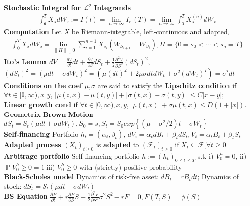 \documentclass[10pt,landscape, a4paper]{article}
\theoremstyle{remark}
\newcommand{\prob}{\operatorname{\mathbb{P}}}
\newcommand{\abs}[1]{\left\lvert #1 \right\rvert}
\begin{document}
\begin{multicols*}{3}
\textbf{Stochastic Integral for $\mathcal{L}^2$ Integrands}
\begin{align*}
    \int^T_0 X_s d W_s := I(t) =\lim_{n \to \infty} I_n (T) =\lim_{n \to \infty } \int^T_{0} X_s^{(n)} d W_s
\end{align*}
\textbf{Computation} Let $X$ be Riemann-integrable, left-continuous and adapted,
\begin{align*}
    \int^T_0 X_s dW_s = \lim_{\lVert \Pi \rVert \downarrow 0} \sum^{n-1}_{i=1} X_{s_i} (W_{S_{i+1}} - W_{S_i}), \Pi = \{0 =s_0 < \cdots < s_n =T \}
\end{align*}
\textbf{Ito's Lemma} $dV = \frac{\partial V}{\partial t} dt + \frac{\partial V}{\partial S} dS_t + \frac{1}{2} \frac{\partial^2 V}{\partial S^2} (dS_t)^2$, $(dS_t)^2 = (\mu dt + \sigma dW_t)^2 = \left(\mu (dt)^2 +2\mu \sigma dt dW_t + \sigma^2 (dW_t)^2\right) = \sigma^2 dt$\\
\textbf{Conditions on the coef} $\mu , \sigma$ are said to satisfy the \textbf{Lipschitz condition} if $\forall t \in [0, \infty), x, y$, 
$\abs{\mu(t, x) - \mu(t, y)} + \abs{\sigma(t, x) - \sigma(t, y)} \leq C \abs{x-y}$;\\
\textbf{Linear growth cond} if $\forall t \in [0, \infty), x, y$, $\abs{\mu (t, x)} + \sigma{\mu (t, x)} \leq D (1 + \abs{x})$.\\

\textbf{Geometrix Brown Motion} $dS_t = S_t (\mu dt + \sigma dW_t), S_0 = s, S_t = S_0 exp\left\{(\mu - \sigma^2 / 2)t + \sigma W_t \right\}$\\

\textbf{Self-financing} Portfolio $h_t = (\alpha_t, \beta_t)$, $d V_t = \alpha_t d B_t + \beta_t d S_t, V_t = \alpha_t B_t + \beta_t S_t$\\

\textbf{Adapted process} $(X_t)_{t\geq 0}$ is \textbf{adapted} to $(\mathcal{F}_t)_{t\geq 0}$ if $X_t \subseteq \mathcal{F}_t \forall t \geq 0$\\

\textbf{Arbitrage portfolio} Self-financing portfolio $h:= (h_t)_{0\leq t \leq T}$ s.t. i) $V^h_0 = 0$, ii) $\prob{V^h_0 \geq 0} = 1$ iii) $V^h_0 \geq 0$ with (strictly) positive probability\\

\textbf{Black-Scholes model} Dynamics of risk-free asset: $d B_t = rB_t dt$; Dynamics of stock: $dS_t = S_t (\mu dt + \sigma dW_t )$\\
\textbf{BS Equation} $\frac{\partial F}{\partial t} + r \frac{\partial F}{\partial S} S + \frac{1}{2} \frac{\partial^2 F}{\partial S^2} \sigma^2 S^2 - rF = 0, F(T, S) = \phi (S)$\\


\end{multicols*}
\end{document}
